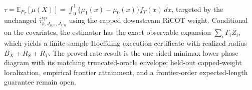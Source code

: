 \(\tau=\mathbb E_{P_T}[\mu(X)]=\int_0^1\{\mu_1(x)-\mu_0(x)\}f_T(x)\,dx\), targeted by the unchanged \(\widehat\tau^{\mathrm{sp}}_{h,J_{\mu,n},J_{r,n}}\) using the capped downstream RiCOT weight. Conditional on the covariates, the estimator has the exact observable expansion \(\sum_i\Gamma_i Z_i\), which yields a finite-sample Hoeffding execution certificate with realized radius \(B_X+R_S+R_T\). The proved rate result is the one-sided minimax lower phase diagram with its matching truncated-oracle envelope; held-out capped-weight localization, empirical frontier attainment, and a frontier-order expected-length guarantee remain open.